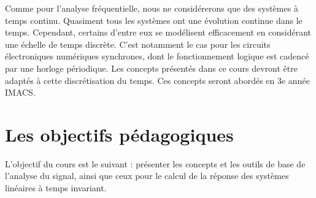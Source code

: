 	Comme pour l'analyse fréquentielle, nous ne considérerons que des systèmes à temps continu. Quasiment tous les systèmes ont une évolution continue dans le temps. Cependant, certains d'entre eux se modélisent efficacement en considérant une échelle de temps discrète. C'est notamment le cas pour les circuits électroniques numériques synchrones, dont le fonctionnement logique est cadencé par une horloge périodique. Les concepts présentés dans ce cours devront être adaptés à cette discrétisation du temps. Ces concepts seront abordés en 3e année IMACS. 
	
	

	
	
	
	\section{Les objectifs pédagogiques}
	L'objectif du cours est le suivant : présenter les concepts et les outils de base de l'analyse du signal, ainsi que ceux pour le calcul de la réponse des systèmes linéaires à temps invariant.
	
